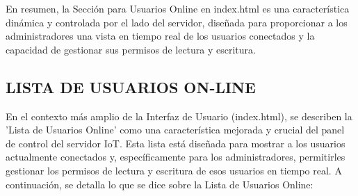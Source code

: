 \documentclass{report}
\begin{document}
En resumen, la Sección para Usuarios Online en index.html es una característica dinámica y controlada por el lado del servidor, 
diseñada para proporcionar a los administradores una vista en tiempo real de los usuarios conectados y la capacidad de gestionar 
sus permisos de lectura y escritura.

\subsection{LISTA DE USUARIOS ON-LINE}
En el contexto más amplio de la Interfaz de Usuario (index.html), se  describen la 'Lista de Usuarios Online' como una 
característica mejorada y crucial del panel de control del servidor IoT. Esta lista está diseñada para mostrar a los usuarios 
actualmente conectados y, específicamente para los administradores, permitirles gestionar los permisos de lectura y escritura de 
esos usuarios en tiempo real.
A continuación, se detalla lo que se  dice sobre la Lista de Usuarios Online:
\end{document}
